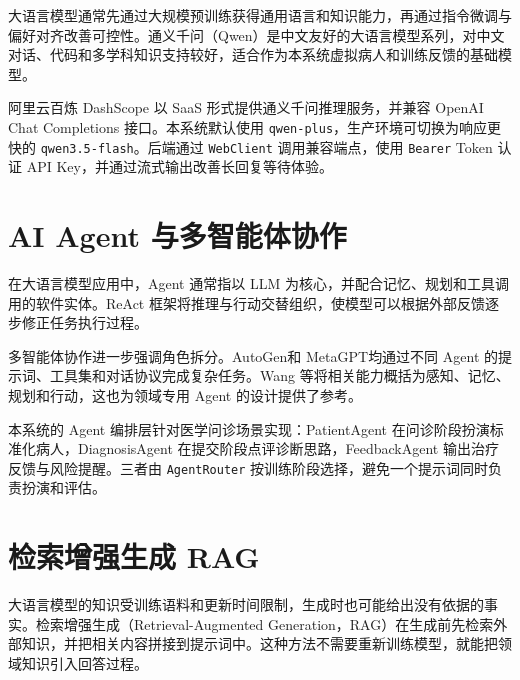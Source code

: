大语言模型通常先通过大规模预训练获得通用语言和知识能力，再通过指令微调与偏好对齐改善可控性。通义千问（Qwen）是中文友好的大语言模型系列\cite{bai2023qwen}，对中文对话、代码和多学科知识支持较好，适合作为本系统虚拟病人和训练反馈的基础模型。

阿里云百炼 DashScope 以 SaaS 形式提供通义千问推理服务，并兼容 OpenAI Chat Completions 接口\cite{dashscope2024}。本系统默认使用 \texttt{qwen-plus}，生产环境可切换为响应更快的 \texttt{qwen3.5-flash}。后端通过 \texttt{WebClient} 调用兼容端点，使用 \texttt{Bearer} Token 认证 API Key，并通过流式输出改善长回复等待体验。

\section{AI Agent 与多智能体协作}

在大语言模型应用中，Agent 通常指以 LLM 为核心，并配合记忆、规划和工具调用的软件实体。ReAct 框架\cite{yao2023react}将推理与行动交替组织，使模型可以根据外部反馈逐步修正任务执行过程。

多智能体协作进一步强调角色拆分。AutoGen\cite{wu2023autogen}和 MetaGPT\cite{hong2024metagpt}均通过不同 Agent 的提示词、工具集和对话协议完成复杂任务。Wang 等\cite{wang2024llmagent}将相关能力概括为感知、记忆、规划和行动，这也为领域专用 Agent 的设计提供了参考。

本系统的 Agent 编排层针对医学问诊场景实现：PatientAgent 在问诊阶段扮演标准化病人，DiagnosisAgent 在提交阶段点评诊断思路，FeedbackAgent 输出治疗反馈与风险提醒。三者由 \texttt{AgentRouter} 按训练阶段选择，避免一个提示词同时负责扮演和评估。

\section{检索增强生成 RAG}

大语言模型的知识受训练语料和更新时间限制，生成时也可能给出没有依据的事实。检索增强生成（Retrieval-Augmented Generation，RAG）在生成前先检索外部知识，并把相关内容拼接到提示词中\cite{lewis2020rag}。这种方法不需要重新训练模型，就能把领域知识引入回答过程。

